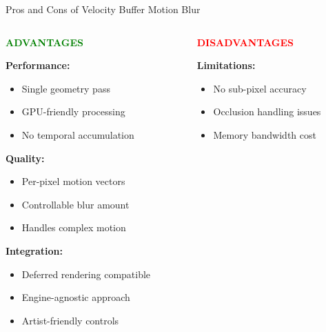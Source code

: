 \documentclass[aspectratio=169]{beamer}
\begin{document}
\begin{frame}{Pros and Cons of Velocity Buffer Motion Blur}
    \begin{columns}[t]
        \begin{column}{0.48\textwidth}
            \textcolor{green}{\large\textbf{ADVANTAGES}}
            \vspace{0.2cm}
            
            \colorbox{green!12}{\parbox{\textwidth-2\fboxsep}{
                \textbf{Performance:}
                \begin{itemize}
                    \item Single geometry pass
                    \item GPU-friendly processing
                    \item No temporal accumulation
                \end{itemize}
                
                \textbf{Quality:}
                \begin{itemize}
                    \item Per-pixel motion vectors
                    \item Controllable blur amount
                    \item Handles complex motion
                \end{itemize}
                
                \textbf{Integration:}
                \begin{itemize}
                    \item Deferred rendering compatible
                    \item Engine-agnostic approach
                    \item Artist-friendly controls
                \end{itemize}
            }}
        \end{column}
        
        \begin{column}{0.48\textwidth}
            \textcolor{red}{\large\textbf{DISADVANTAGES}}
            \vspace{0.2cm}
            
            \colorbox{red!12}{\parbox{\textwidth-2\fboxsep}{
                \textbf{Limitations:}
                \begin{itemize}
                    \item No sub-pixel accuracy
                    \item Occlusion handling issues
                    \item Memory bandwidth cost
                \end{itemize}
                
}}
\end{column}
\end{columns}
\end{frame}
\end{document}
